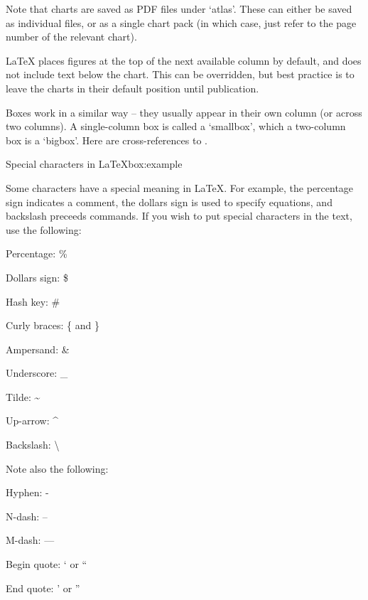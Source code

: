 Note that charts are saved as PDF files under `atlas'. These can either be saved as individual files, or as a single chart pack (in which case, just refer to the page number of the relevant chart). 

LaTeX places figures at the top of the next available column by default, and does not include text below the chart. This can be overridden, but best practice is to leave the charts in their default position until publication.

Boxes work in a similar way -- they usually appear in their own column (or across two columns). %
A single-column box is called a `smallbox', which a two-column box is a `bigbox'. Here are cross-references to .

\begin{smallbox}{Special characters in LaTeX}{box:example}

Some characters have a special meaning in LaTeX. For example, the percentage sign indicates a comment, the dollars sign is used to specify equations, and backslash preceeds commands. If you wish to put special characters in the text, use the following:

Percentage: \%

Dollars sign: \$

Hash key: \#

Curly braces: \{ and \}

Ampersand: \&

Underscore: \_

Tilde: \~{}

Up-arrow: \^{}

Backslash: \textbackslash

Note also the following:

Hyphen: -

N-dash: --

M-dash: ---

Begin quote: ` or ``

End quote: ' or ''

\end{smallbox}

